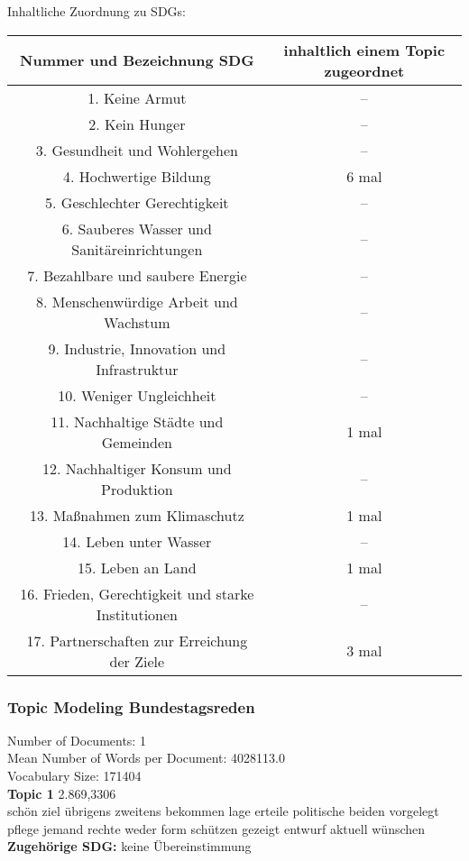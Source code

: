 \documentclass[letterpaper]{article}
\begin{document}
Inhaltliche Zuordnung zu SDGs: \\
\begin{tabular}{ |c|c|} 
\hline
Nummer und Bezeichnung SDG & inhaltlich einem Topic zugeordnet\\
\hline
1. Keine Armut & -- \\ 
\hline 
2. Kein Hunger & -- \\
\hline
3. Gesundheit und Wohlergehen & -- \\
\hline
4. Hochwertige Bildung & 6 mal \\
\hline 
5. Geschlechter Gerechtigkeit & -- \\
\hline
6. Sauberes Wasser und Sanitäreinrichtungen & -- \\
\hline
7. Bezahlbare und saubere Energie & -- \\
\hline 
8. Menschenwürdige Arbeit und Wachstum & -- \\
\hline 
9. Industrie, Innovation und Infrastruktur & -- \\
\hline 
10. Weniger Ungleichheit & -- \\
\hline 
11. Nachhaltige Städte und Gemeinden & 1 mal \\
\hline 
12. Nachhaltiger Konsum und Produktion & -- \\
\hline 
13. Maßnahmen zum Klimaschutz & 1 mal \\
\hline 
14. Leben unter Wasser & -- \\
\hline 
15. Leben an Land & 1 mal \\
\hline 
16. Frieden, Gerechtigkeit und starke Institutionen & -- \\
\hline 
17. Partnerschaften zur Erreichung der Ziele & 3 mal \\
\hline 
\end{tabular}
   

\subsubsection{Topic Modeling Bundestagsreden}
Number of Documents: 1\\
Mean Number of Words per Document: 4028113.0\\
Vocabulary Size: 171404\\

\textbf{Topic 1} 2.869,3306 \\
schön ziel übrigens zweitens bekommen lage erteile politische beiden vorgelegt pflege jemand rechte weder form schützen gezeigt entwurf aktuell wünschen\\
  \textbf{Zugehörige SDG:}  keine Übereinstimmung\\
\end{document}
